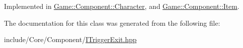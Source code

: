 Implemented in \mbox{\hyperlink{class_game_1_1_component_1_1_character_a1acc86ac5340ef65ba18d755f1ea37f9}{Game\+::\+Component\+::\+Character}}, and \mbox{\hyperlink{class_game_1_1_component_1_1_item_a33c72fb48b46ce7b67b924472d0f3456}{Game\+::\+Component\+::\+Item}}.



The documentation for this class was generated from the following file\+:\begin{DoxyCompactItemize}
\item 
include/\+Core/\+Component/\mbox{\hyperlink{_i_trigger_exit_8hpp}{I\+Trigger\+Exit.\+hpp}}\end{DoxyCompactItemize}
